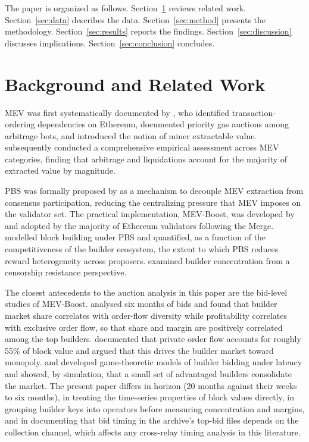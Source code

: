\documentclass[11pt]{article}
\begin{document}
The paper is organized as follows. Section~\ref{sec:background} reviews related
work. Section~\ref{sec:data} describes the data. Section~\ref{sec:method}
presents the methodology. Section~\ref{sec:results} reports the findings.
Section~\ref{sec:discussion} discusses implications.
Section~\ref{sec:conclusion} concludes.

\section{Background and Related Work}
\label{sec:background}

MEV was first systematically documented by \citet{daian2020}, who identified
transaction-ordering dependencies on Ethereum, documented priority gas auctions
among arbitrage bots, and introduced the notion of miner extractable value. \citet{qin2022} subsequently
conducted a comprehensive empirical assessment across MEV categories, finding
that arbitrage and liquidations account for the majority of extracted value by
magnitude.

PBS was formally proposed by \citet{buterin2021} as a mechanism to decouple MEV
extraction from consensus participation, reducing the centralizing pressure that
MEV imposes on the validator set. The practical implementation, MEV-Boost, was
developed by \citet{flashbots2022} and adopted by the majority of Ethereum
validators following the Merge. \citet{bahrani2024} modelled block building under PBS
and quantified, as a function of the competitiveness of the builder ecosystem,
the extent to which PBS reduces reward heterogeneity across proposers. \citet{wahrstatter2023}
examined builder concentration from a censorship resistance perspective.

The closest antecedents to the auction analysis in this paper are the
bid-level studies of MEV-Boost. \citet{oz2024} analysed six months of bids and
found that builder market share correlates with order-flow diversity while
profitability correlates with exclusive order flow, so that share and margin
are positively correlated among the top builders. \citet{wang2024} documented
that private order flow accounts for roughly 55\% of block value and argued
that this drives the builder market toward monopoly. \citet{wu2023} and
\citet{wu2024} developed game-theoretic models of builder bidding under
latency and showed, by simulation, that a small set of advantaged builders
consolidate the market. The present paper differs in horizon (20 months
against their weeks to six months), in treating the time-series properties of
block values directly, in grouping builder keys into operators before
measuring concentration and margins, and in documenting that bid timing in
the archive's top-bid files depends on the collection channel, which affects
any cross-relay timing analysis in this literature.
\end{document}
